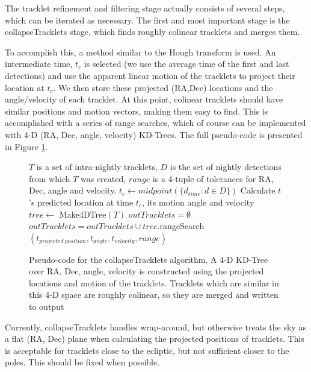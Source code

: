 The tracklet refinement and filtering stage actually consists of
several steps, which can be iterated as necessary.  The first and most
important stage is the collapseTracklets stage, which finds roughly
colinear tracklets and merges them.  

To accomplish this, a method similar to the Hough transform is used.
An intermediate time, $t_c$ is selected (we use the average time of
the first and last detections) and use the apparent linear motion of
the tracklets to project their location at $t_c$.  We then store these
projected (RA,Dec) locations and the angle/velocity of each tracklet.
At this point, colinear tracklets should have similar positions and
motion vectors, making them easy to find.  This is accomplished with a
series of range searches, which of course can be implemented with 4-D
(RA, Dec, angle, velocity) KD-Trees.  The full pseudo-code is
presented in Figure \ref{collapseTrackletsAlgorithm}.

\begin{figure}[ht]
\begin{algorithmic}
  \REQUIRE $T$ is a set of intra-nightly tracklets, $D$ is the set of nightly detections from which $T$ was created, $range$ is a 4-tuple of tolerances for RA, Dec, angle and velocity.
  \STATE $t_c \gets midpoint(\{ d_{time} : d \in D \})$
    \STATE Calculate $t$'s predicted location at time $t_c$, its motion angle and velocity
  \ENDFOR
  \STATE {}
  \STATE $tree \gets$ Make4DTree$(T)$
  \STATE $outTracklets = \emptyset$
    \STATE {}
     \STATE $outTracklets = outTracklets \cup tree.$rangeSearch$(t_{projected\ position}, t_{angle}, t_{velocity}, range)$
  \ENDFOR
\end{algorithmic}

\caption{Pseudo-code for the collapseTracklets algorithm. A 4-D KD-Tree over RA, Dec, angle, velocity is constructed using the projected locations and motion of the tracklets.  Tracklets which are similar in this 4-D space are roughly colinear, so they are merged and written to output}

\label{collapseTrackletsAlgorithm}

\end{figure}

Currently, collapseTracklets handles wrap-around, but otherwise treats
the sky as a flat (RA, Dec) plane when calculating the projected
positions of tracklets.  This is acceptable for tracklets close to the
ecliptic, but not sufficient closer to the poles.  This should be
fixed when possible.

